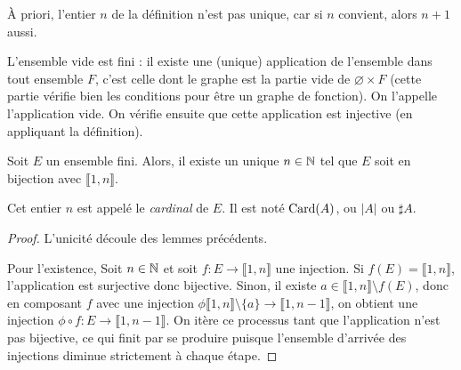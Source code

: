 À priori, l'entier $n$ de la définition n'est pas unique, car si $n$ convient, alors $n+1$ aussi.

\begin{remarque}[Zérologie]
L'ensemble vide est fini : il existe une (unique) application de l'ensemble dans tout ensemble $F$, c'est celle dont le graphe est la partie vide de $\varnothing\times F$ (cette partie vérifie bien les conditions pour être un graphe de fonction). On l'appelle \og l'application vide\fg.
On vérifie ensuite que cette application est injective (en appliquant la définition).
\end{remarque}


\begin{propdef}
Soit $E$ un ensemble fini. Alors, il existe un unique $n\in \mathbb{N}$ tel que $E$ soit en bijection avec $\llbracket 1,n\rrbracket$.

Cet entier $n$ est appelé le \emph{cardinal} de $E$. Il est noté $\operatorname{Card}(A)$, ou $|A|$ ou $\sharp A$.
\end{propdef}
\begin{proof}
L'unicité découle des lemmes précédents.

Pour l'existence, Soit $n\in \mathbb{N}$ et soit $f : E\to \llbracket 1,n\rrbracket$ une injection.
Si $f(E) = \llbracket 1,n\rrbracket$, l'application est surjective donc bijective.
Sinon, il existe $a\in \llbracket 1,n\rrbracket \setminus f(E)$, donc en composant $f$ avec une injection $\phi \llbracket 1,n\rrbracket \setminus \{a\} \to \llbracket 1,n-1\rrbracket$, on obtient une injection $\phi\circ f : E \to \llbracket 1,n-1\rrbracket$.
On itère ce processus tant que l'application n'est pas bijective, ce qui finit par se produire puisque l'ensemble d'arrivée des injections diminue strictement à chaque étape.
\end{proof}


